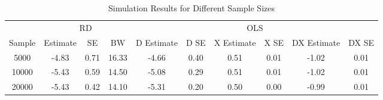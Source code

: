 \begin{table}

\caption{\label{tab:tab:sim_results}Simulation Results for Different Sample Sizes}
\centering
\begin{tabular}[t]{cccccccccc}
\toprule
\multicolumn{1}{c}{ } & \multicolumn{3}{c}{RD} & \multicolumn{6}{c}{OLS} \\
\cmidrule(l{3pt}r{3pt}){2-4} \cmidrule(l{3pt}r{3pt}){5-10}
Sample & Estimate & SE & BW & D Estimate & D SE & X Estimate & X SE & DX Estimate & DX SE\\
\midrule
5000 & -4.83 & 0.71 & 16.33 & -4.66 & 0.40 & 0.51 & 0.01 & -1.02 & 0.01\\
10000 & -5.43 & 0.59 & 14.50 & -5.08 & 0.29 & 0.51 & 0.01 & -1.02 & 0.01\\
20000 & -5.43 & 0.42 & 14.10 & -5.31 & 0.20 & 0.50 & 0.00 & -0.99 & 0.01\\
\bottomrule
\end{tabular}
\end{table}
